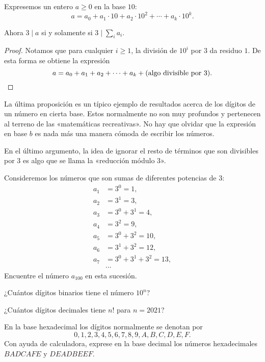 \begin{proposicion}
  Expresemos un entero $a \ge 0$ en la base $10$:
  $$a = a_0 + a_1\cdot 10 + a_2\cdot 10^2 + \cdots + a_k\cdot 10^k.$$

  Ahora $3\mid a$ si y solamente si $3 \mid \sum_i a_i$.

  \begin{proof}
    Notamos que para cualquier $i \ge 1$, la división de $10^i$ por $3$ da
    residuo $1$. De esta forma se obtiene la expresión
    \[ a = a_0 + a_1 + a_2 + \cdots + a_k + (\text{algo divisible por }3). \qedhere \]
  \end{proof}
\end{proposicion}

La última proposición es un típico ejemplo de resultados acerca de los dígitos
de un número en cierta base. Estos normalmente no son muy profundos y pertenecen
al terreno de las «matemáticas recreativas». No hay que olvidar que la expresión
en base $b$ es nada más una manera cómoda de escribir los números.

En el último argumento, la idea de ignorar el resto de términos que son
divisibles por $3$ es algo que se llama la «reducción módulo $3$».

\begin{ejercicio}
  Consideremos los números que son sumas de diferentes potencias de $3$:
  \begin{align*}
    a_1 & = 3^0 = 1, \\
    a_2 & = 3^1 = 3, \\
    a_3 & = 3^0 + 3^1 = 4, \\
    a_4 & = 3^2 = 9, \\
    a_5 & = 3^0 + 3^2 = 10, \\
    a_6 & = 3^1 + 3^2 = 12, \\
    a_7 & = 3^0 + 3^1 + 3^2 = 13, \\
        & \cdots
  \end{align*}
  Encuentre el número $a_{100}$ en esta sucesión.
\end{ejercicio}

\begin{ejercicio}
  ¿Cuántos dígitos binarios tiene el número $10^n$?
\end{ejercicio}

\begin{ejercicio}
  ¿Cuántos dígitos decimales tiene $n!$ para $n = 2021$?
\end{ejercicio}

\begin{ejercicio}
  En la base hexadecimal los dígitos normalmente se denotan por
  $$0,1,2,3,4,5,6,7,8,9,A,B,C,D,E,F.$$
  Con ayuda de calculadora, exprese en la base decimal los números hexadecimales
  $BADCAFE$ y $DEADBEEF$.
\end{ejercicio}

